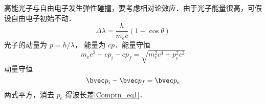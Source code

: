 

高能光子与自由电子发生弹性碰撞，要考虑相对论效应．由于光子能量很高，可假设自由电子初始不动．
\begin{equation}\label{Comptn_eq1}
\Delta \lambda  = \frac{h}{m_e c}(1 - \cos\theta )
\end{equation}
光子的动量为 $p = h/\lambda$， 能量为 $cp$．能量守恒
\begin{equation}
m_e c^2 + c p_i - c p_f = \sqrt{m_e^2 c^4 + p_e^2 c^2}
\end{equation}
动量守恒
\begin{equation}
\bvec p_i - \bvec p_f = \bvec p_e
\end{equation}
两式平方，消去 $p_e$ 得波长差\autoref{Comptn_eq1}．
 